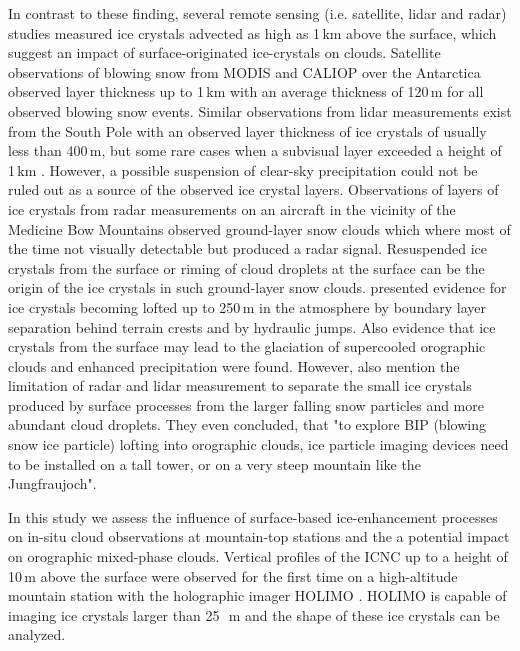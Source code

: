\documentclass[draft,linenumbers]{agujournal}
\begin{document}
In contrast to these finding, several remote sensing (i.e. satellite, lidar and radar) studies measured ice crystals advected as high as 1\,\si{km} above the surface, which suggest an impact of surface-originated ice-crystals on clouds. Satellite observations of blowing snow from MODIS and CALIOP over the Antarctica \citep{Pal11} observed layer thickness up to 1\,\si{km} with an average thickness of 120\,\si{m} for all observed blowing snow events. Similar observations from lidar measurements exist from the South Pole with an observed layer thickness of ice crystals of usually less than 400\,\si{m}, but some rare cases when a subvisual layer exceeded a height of 1\,\si{km} \citep{Mah03}. However, a possible suspension of clear-sky precipitation could not be ruled out as a source of the observed ice crystal layers. Observations of layers of ice crystals from radar measurements on an aircraft in the vicinity of the Medicine Bow Mountains \citep{Val12} observed ground-layer snow clouds which where most of the time not visually detectable but produced a radar signal. Resuspended ice crystals from the surface or riming of cloud droplets at the surface can be the origin of the ice crystals in such ground-layer snow clouds. \citet{Gee15} presented evidence for ice crystals becoming lofted up to 250\,\si{m} in the atmosphere by boundary layer separation behind terrain crests and by hydraulic jumps. Also evidence that ice crystals from the surface may lead to the glaciation of supercooled orographic clouds and enhanced precipitation were found. However, \citet{Gee15} also mention the limitation of radar and lidar measurement to separate the small ice crystals produced by surface processes from the larger falling snow particles and more abundant cloud droplets. They even concluded, that "to explore BIP (blowing snow ice particle) lofting into orographic clouds, ice particle imaging devices need to be installed on a tall tower, or on a very steep mountain like the Jungfraujoch".

In this study we assess the influence of surface-based ice-enhancement processes on in-situ cloud observations at mountain-top stations and the a potential impact on orographic mixed-phase clouds. Vertical profiles of the ICNC up to a height of 10\,\si{m} above the surface were observed for the first time on a high-altitude mountain station with the holographic imager HOLIMO \citep{Bec17}. HOLIMO is capable of imaging ice crystals larger than 25\,\si{\mu m} and the shape of these ice crystals can be analyzed.
\end{document}

